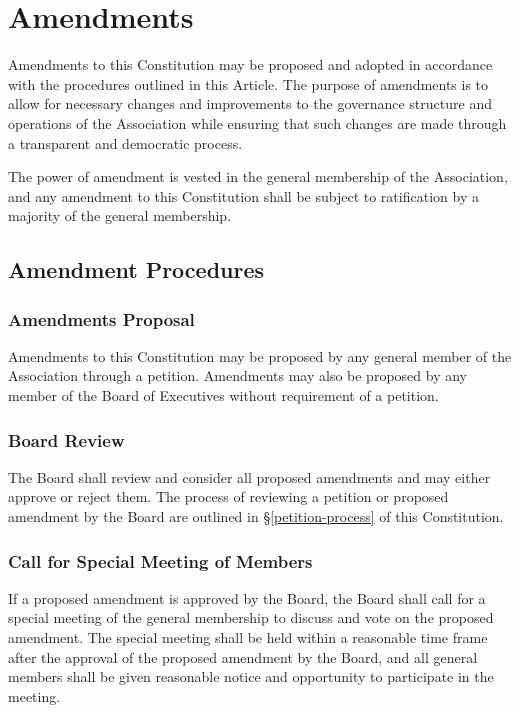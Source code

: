 \chapter{Amendments}

Amendments to this Constitution may be proposed and adopted in accordance
 with the procedures outlined in this Article. The purpose of amendments 
 is to allow for necessary changes and improvements to the governance 
 structure and operations of the Association while ensuring that such 
 changes are made through a transparent and democratic process.

 The power of amendment is vested in the general membership of the Association, 
 and any amendment to this Constitution shall be subject to ratification by a 
 majority of the general membership.

\section{Amendment Procedures}

\subsection{Amendments Proposal}
Amendments to this Constitution may be proposed by any general member 
of the Association through a petition. Amendments may also be proposed by
any member of the Board of Executives without requirement of a petition.

\subsection{Board Review}
The Board shall review and consider all proposed amendments and may either approve or reject them. 
The process of reviewing a petition or proposed amendment by the Board are outlined in \S\ref{petition-process} 
of this Constitution.

\subsection{Call for Special Meeting of Members}
If a proposed amendment is approved by the Board, the Board shall call for 
a special meeting of the general membership to discuss and vote on the proposed amendment. 
The special meeting shall be held within a reasonable time frame after the approval of the 
proposed amendment by the Board, and all general members shall be given reasonable notice 
and opportunity to participate in the meeting.

